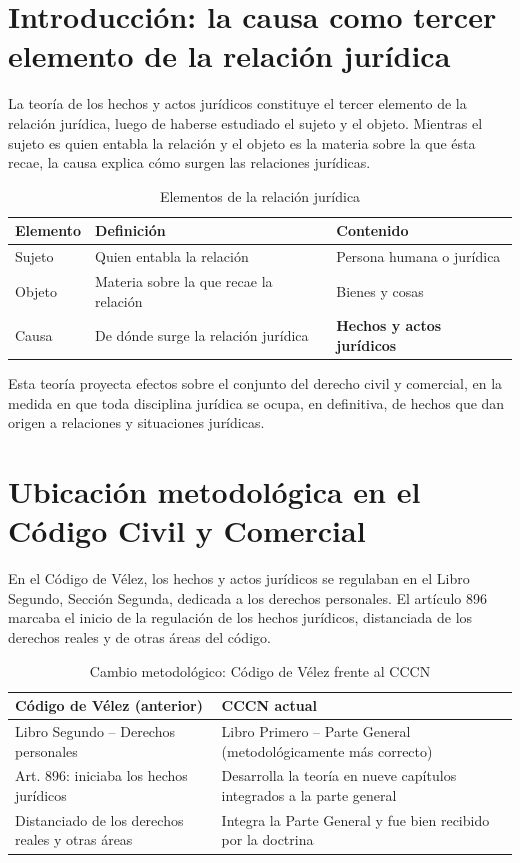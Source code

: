 \documentclass[12pt,oneside]{book}
\begin{document}
\section{Introducción: la causa como tercer elemento de la relación jurídica}

La teoría de los hechos y actos jurídicos constituye el tercer elemento de la relación jurídica, luego de haberse estudiado el sujeto y el objeto. Mientras el sujeto es quien entabla la relación y el objeto es la materia sobre la que ésta recae, la causa explica cómo surgen las relaciones jurídicas.

\begin{table}[H]
\centering
\caption{Elementos de la relación jurídica}
\begin{tabularx}{\textwidth}{l l X}
\toprule
\textbf{Elemento} & \textbf{Definición} & \textbf{Contenido} \\
\midrule
Sujeto & Quien entabla la relación & Persona humana o jurídica \\
Objeto & Materia sobre la que recae la relación & Bienes y cosas \\
Causa & De dónde surge la relación jurídica & \textbf{Hechos y actos jurídicos} \\
\bottomrule
\end{tabularx}
\end{table}

Esta teoría proyecta efectos sobre el conjunto del derecho civil y comercial, en la medida en que toda disciplina jurídica se ocupa, en definitiva, de hechos que dan origen a relaciones y situaciones jurídicas.

\section{Ubicación metodológica en el Código Civil y Comercial}

En el Código de Vélez, los hechos y actos jurídicos se regulaban en el Libro Segundo, Sección Segunda, dedicada a los derechos personales. El artículo 896 marcaba el inicio de la regulación de los hechos jurídicos, distanciada de los derechos reales y de otras áreas del código.

\begin{table}[H]
\centering
\caption{Cambio metodológico: Código de Vélez frente al CCCN}
\begin{tabularx}{\textwidth}{X X}
\toprule
\textbf{Código de Vélez (anterior)} & \textbf{CCCN actual} \\
\midrule
Libro Segundo -- Derechos personales & Libro Primero -- Parte General (metodológicamente más correcto) \\
Art. 896: iniciaba los hechos jurídicos & Desarrolla la teoría en nueve capítulos integrados a la parte general \\
Distanciado de los derechos reales y otras áreas & Integra la Parte General y fue bien recibido por la doctrina \\
\bottomrule
\end{tabularx}
\end{table}
\end{document}
